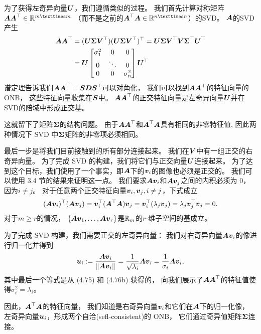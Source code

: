 为了获得左奇异向量$\U$，我们遵循类似的过程。
我们首先计算对称矩阵$\A\A^\top \in \R^{m×m}$
（而不是之前的$\A^\top\A \in \R^{n×n}$）的SVD。
$\A$的SVD产生
\begin{subequations}
    \begin{align}
     \A\A^\top &=
    (\U\bs{\Sigma}\V^\top)
    (\U\bs{\Sigma}\V^\top)^\top
    = \U\bs{\Sigma}\V^\top\V\bs{\Sigma}^\top\U^\top \\
    &= \U
    \begin{bmatrix}
        \sigma_1^2 & 0 & 0 \\
        0 & \ddots & 0 \\
        0 & 0 & \sigma_n^2
    \end{bmatrix} \U^\top
    \end{align}
\end{subequations}
谱定理告诉我们$\A\A^\top = \S\D\S^\top$可以对角化，
我们可以找到$\A\A^\top$的特征向量的ONB，
这些特征向量收集在$\S$中。
$\A\A^\top$的正交特征向量是左奇异向量$\U$并在SVD的陪域中形成正交基。

这就留下了矩阵$\bs{\Sigma}$的结构问题。
由于$\A\A^\top$和$\A^\top\A$具有相同的非零特征值,
因此两种情况下 SVD 中$\bs{\Sigma}$矩阵的非零项必须相同。

最后一步是将我们目前接触到的所有部分连接起来。
我们在$\V$中有一组正交的右奇异向量。
为了完成 SVD 的构建，我们将它们与正交向量$\U$连接起来。
为了达到这个目标，我们使用了一个事实，即$\A$下的$\v_i$的图像也必须是正交的。
我们可以使用 3.4 节的结果来证明这一点。
我们要求$\A\v_i$和$\A\v_j$之间的内积必须为 0，因为$i \neq j$。
对于任意两个正交特征向量$\v_i,\v_j, i \neq j$，下式成立
\begin{equation}
    (\A\v_i)^\top(\A\v_j) =
    \v_i^\top(\A^\top\A)\v_j =
    \v_i^\top(\lambda_j\v_j) =
    \lambda_j\v_j^\top\v_j = 0.
\end{equation}
对于$m \geqslant r$的情况，
$\{\A\v_1,\dots,\A\v_r\}$是$\R_m$的$r$-维子空间的基成立。

为了完成 SVD 构建，我们需要正交的左奇异向量：
我们对右奇异向量$\A\v_i$的像进行归一化并得到
\begin{equation}
    \u_i :=
    \frac{\A\v_i}{\norm{\A\v_i}} =
    \frac{1}{\sqrt{\lambda_i}}\A\v_i =
    \frac{1}{\sigma_i}\A\v_i,
\end{equation}
其中最后一个等式是从 (4.75) 和 (4.76b) 获得的，
向我们展示了$\A\A^\top$的特征值使得$\sigma_i^2 = \lambda_i$。

因此，$\A^\top\A$的特征向量，
我们知道是右奇异向量$\v_i$和它们在$\A$下的归一化像，
左奇异向量$\u_i$，形成两个自洽(sefl-consistent)的 ONB，
它们通过奇异值矩阵$\bs{\Sigma}$连接。

